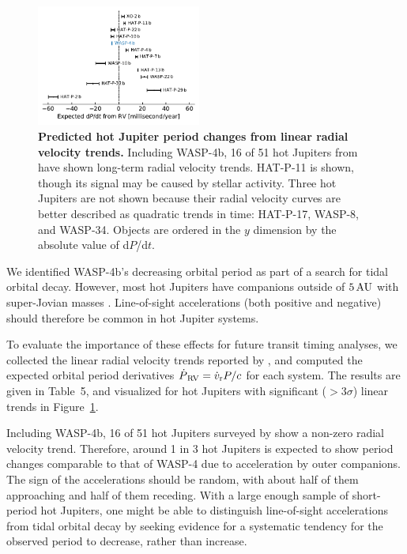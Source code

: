 \documentclass[12pt,twocolumn,tighten]{aastex62}
\begin{document}
\begin{figure}[t]
	\begin{center}
		\leavevmode
		\includegraphics[width=0.48\textwidth]{f5.pdf}
	\end{center}
	\vspace{-0.4cm}
	\caption{
  {\bf Predicted hot Jupiter period changes from linear radial
  velocity trends.} Including WASP-4b, 16 of 51 hot Jupiters from
  \citet{knutson_friends_2014} have shown long-term radial velocity
  trends.  HAT-P-11 is shown, though its signal may be caused by
  stellar activity.  Three hot Jupiters are not shown because their
  radial velocity curves are better described as quadratic trends in
  time: HAT-P-17, WASP-8, and WASP-34.  Objects are ordered in the $y$
  dimension by the absolute value of d$P$/d$t$.
	\label{fig:pdot_pop}
  \vspace{-0.3cm}
	}
\end{figure}

We identified WASP-4b's decreasing orbital period as part of a search
for tidal orbital decay.  However, most hot Jupiters have companions
outside of $5\,{\rm AU}$ with super-Jovian masses
\citep{knutson_friends_2014,bryan_statistics_2016}.  Line-of-sight
accelerations (both positive and negative) should therefore be common
in hot Jupiter systems. 

To evaluate the importance of these effects for future transit timing
analyses, we collected the linear radial velocity trends reported by
\citet{knutson_friends_2014}, and computed the expected orbital period
derivatives $\dot{P}_{\rm\,RV} = \dot{v}_{\rm r} P/c$ for each system.
The results are given in Table~5, and visualized for hot Jupiters with
significant ($>$$3\sigma$) linear trends in Figure~\ref{fig:pdot_pop}.

Including WASP-4b, 16 of 51 hot Jupiters surveyed by
\citet{knutson_friends_2014} show a non-zero radial velocity trend.
Therefore, around 1 in 3 hot Jupiters is expected to show period
changes comparable to that of WASP-4 due to acceleration by outer
companions.  The sign of the accelerations should be random, with
about half of them approaching and half of them receding.  With a
large enough sample of short-period hot Jupiters, one might be able to
distinguish line-of-sight accelerations from tidal orbital decay by
seeking evidence for a systematic tendency for the observed period to
decrease, rather than increase.
\end{document}
